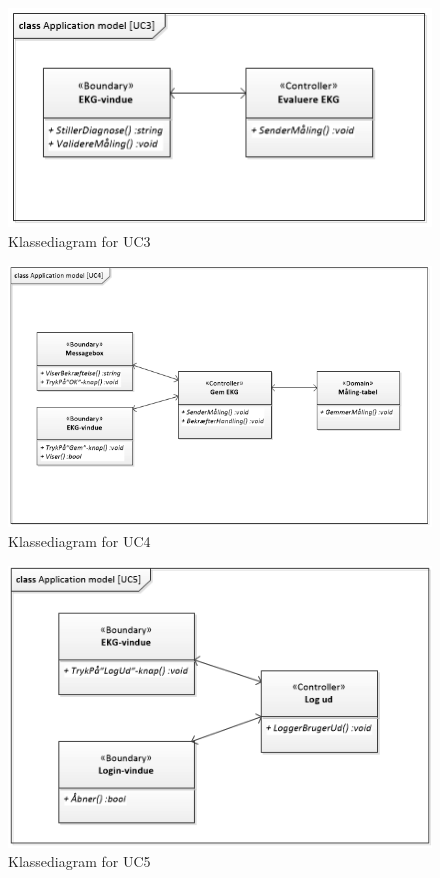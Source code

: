 \begin{figure}[H]
	\centering
	\includegraphics[width=1\textwidth]{Figurer/Snip20150429_23}
	\caption{Klassediagram for UC3}
\end{figure}

\begin{figure}[H]
	\centering
	\includegraphics[width=1\textwidth]{Figurer/Snip20150429_26}
	\caption{Klassediagram for UC4}
\end{figure}

\begin{figure}[H]
	\centering
	\includegraphics[width=1\textwidth]{Figurer/Snip20150429_25}
	\caption{Klassediagram for UC5}
\end{figure}


